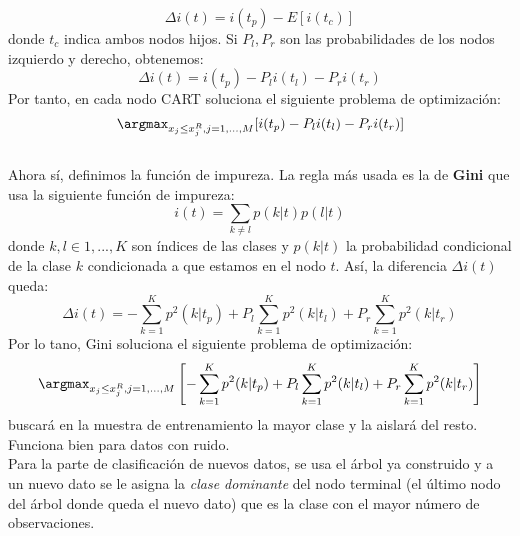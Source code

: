 \[ \Delta i(t) = i(t_{p})-E[i(t_{c})] \]
donde $t_{c}$ indica ambos nodos hijos. Si $P_{l},P_{r}$ son las probabilidades de los nodos izquierdo y derecho, obtenemos:
\[ \Delta i(t)= i(t_{p}) - P_{l} i(t_{l}) - P_{r} i(t_{r}) \]
Por tanto, en cada nodo CART soluciona el siguiente problema de optimización:
\[ \argmax_{x_{j} \leq x_{j}^{R},j=1,...,M}[i(t_{p}) - P_{l} i(t_{l}) - P_{r} i(t_{r})] \]
\cite{timofeev2004classification}\\
Ahora sí, definimos la función de impureza. La regla más usada es la de \textbf{Gini} que usa la siguiente función de impureza:
\[ i(t) = \sum_{k \neq l} p(k \vert t)p(l \vert t) \]
donde $k,l \in {1,...,K}$ son índices de las clases y $p(k \vert t)$ la probabilidad condicional de la clase $k$ condicionada a que estamos en el nodo $t$. Así, la diferencia $\Delta i(t)$ queda:
\[ \Delta i(t) = -\sum_{k=1}^{K} p^{2}(k \vert t_{p}) + P_{l} \sum_{k=1}^{K} p^{2}(k \vert t_{l}) + P_{r} \sum_{k=1}^{K}p^{2}(k \vert t_{r}) \]
Por lo tano, Gini soluciona el siguiente problema de optimización:
\[ \argmax_{x_{j} \leq x_{j}^{R},j=1,...,M} \left[ -\sum_{k=1}^{K} p^{2}(k \vert t_{p}) + P_{l} \sum_{k=1}^{K} p^{2}(k \vert t_{l}) + P_{r} \sum_{k=1}^{K}p^{2}(k \vert t_{r}) \right] \]
buscará en la muestra de entrenamiento la mayor clase y la aislará del resto. Funciona bien para datos con ruido.\\
Para la parte de clasificación de nuevos datos, se usa el árbol ya construido y a un nuevo dato se le asigna la \textit{clase dominante} del nodo terminal (el último nodo del árbol donde queda el nuevo dato) que es la clase con el mayor número de observaciones.\cite{timofeev2004classification}\\
